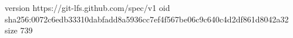 version https://git-lfs.github.com/spec/v1
oid sha256:0072c6edb33310dabfadd8a5936cc7ef4f567be06c9c640c4d2df861d8042a32
size 739
